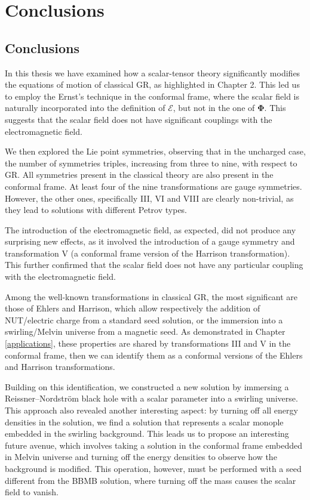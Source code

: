 \chapter{Conclusions}
\thispagestyle{empty}

\section{Conclusions}
In this thesis we have examined how a scalar-tensor theory significantly modifies the equations of motion of classical GR, as highlighted in Chapter 2. This led us to employ the Ernst's technique in the conformal frame, where the scalar field is naturally incorporated into the definition of $\mathcal{E}$, but not in the one of $\boldsymbol{\Phi}$. This suggests that the scalar field does not have significant couplings with the electromagnetic field.

We then explored the Lie point symmetries, observing that in the uncharged case, the number of symmetries triples, increasing from three to nine, with respect to GR. All symmetries present in the classical theory are also present in the conformal frame. At least four of the nine transformations are gauge symmetries. However, the other ones, specifically III, VI and VIII are clearly non-trivial, as they lead to solutions with different Petrov types.

The introduction of the electromagnetic field, as expected, did not produce any surprising new effects, as it involved the introduction of a gauge symmetry and transformation V (a conformal frame version of the Harrison transformation). This further confirmed that the scalar field does not have any particular coupling with the electromagnetic field.

Among the well-known transformations in classical GR, the most significant are those of Ehlers and Harrison, which allow respectively the addition of NUT/electric charge from a standard seed solution, or the immersion into a swirling/Melvin universe from a magnetic seed. As demonstrated in Chapter \ref{applications}, these properties are shared by transformations III and V in the conformal frame, then we can identify them as a conformal versions of the Ehlers and Harrison transformations.

Building on this identification, we constructed a new solution by immersing a Reissner–Nordström black hole with a scalar parameter into a swirling universe. This approach also revealed another interesting aspect: by turning off all energy densities in the solution, we find a solution that represents a scalar monople embedded in the swirling background. This leads us to propose an interesting future avenue, which involves taking a solution in the conformal frame embedded in Melvin universe and turning off the energy densities to observe how the background is modified. This operation, however, must be performed with a seed different from the BBMB solution, where turning off the mass causes the scalar field to vanish.

